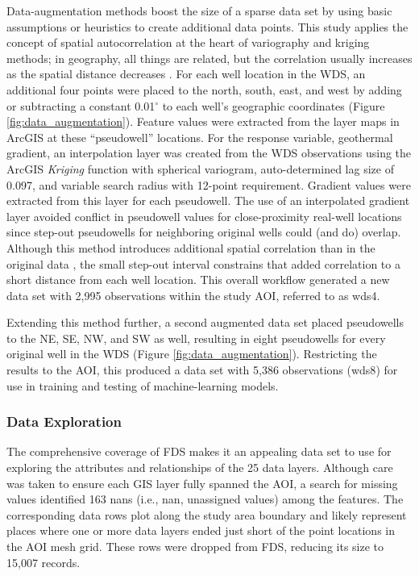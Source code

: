 Data-augmentation methods boost the size of a sparse data set by using basic assumptions or heuristics to create additional data points. This study applies the concept of spatial autocorrelation at the heart of variography and kriging methods; in geography, all things are related, but the correlation usually increases as the spatial distance decreases \citep[Chapter\ 13]{gimond_intro_2021}. For each well location in the WDS, an additional four points were placed to the north, south, east, and west by adding or subtracting a constant 0.01$^\circ$ to each well’s geographic coordinates (Figure \ref{fig:data_augmentation}). Feature values were extracted from the layer maps in ArcGIS at these ``pseudowell'' locations. For the response variable, geothermal gradient, an interpolation layer was created from the WDS observations using the ArcGIS \textit{Kriging} function with spherical variogram, auto-determined lag size of 0.097, and variable search radius with 12-point requirement. Gradient values were extracted from this layer for each pseudowell. The use of an interpolated gradient layer avoided conflict in pseudowell values for close-proximity real-well locations since step-out pseudowells for neighboring original wells could (and do) overlap. Although this method introduces additional spatial correlation than in the original data%
, the small step-out interval constrains that added correlation to a short distance from each well location. This overall workflow generated a new data set with 2,995 observations within the study AOI, referred to as \acrshort{wds4}. 

Extending this method further, a second augmented data set placed pseudowells to the NE, SE, NW, and SW as well, resulting in eight pseudowells for every original well in the WDS (Figure \ref{fig:data_augmentation}). Restricting the results to the AOI, this produced a data set with 5,386 observations (\acrshort{wds8}) for use in training and testing of machine-learning models.

\subsubsection{Data Exploration}

The comprehensive coverage of FDS makes it an appealing data set to use for exploring the attributes and relationships of the 25 data layers. Although care was taken to ensure each GIS layer fully spanned the AOI, a search for missing values identified 163 \acrshort{nan}s (i.e., \acrlong{nan}, unassigned values) among the features. The corresponding data rows plot along the study area boundary and likely represent places where one or more data layers ended just short of the point locations in the AOI mesh grid. These rows were dropped from FDS, reducing its size to 15,007 records.

